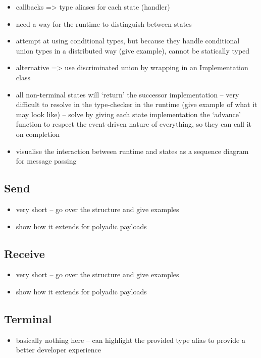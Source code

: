 \begin{itemize}
\item callbacks => type aliases for each state (handler)
\item need a way for the runtime to distinguish between states
\item attempt at using conditional types, but because they handle conditional union types in a distributed way (give example), cannot be statically typed
\item alternative => use discriminated union by wrapping in an Implementation class
\item all non-terminal states will `return' the successor implementation -- very difficult to resolve in the type-checker in the runtime (give example of what it may look like) -- solve by giving each state implementation the `advance' function to respect the event-driven nature of everything, so they can call it on completion
\item visualise the interaction between runtime and states as a sequence diagram for message passing
\end{itemize}

\subsection{Send}
\begin{itemize}
\item very short -- go over the structure and give examples
\item show how it extends for polyadic payloads
\end{itemize}

\subsection{Receive}
\begin{itemize}
\item very short -- go over the structure and give examples
\item show how it extends for polyadic payloads
\end{itemize}

\subsection{Terminal}
\begin{itemize}
\item basically nothing here -- can highlight the provided type alias to provide a better developer experience
\end{itemize}

